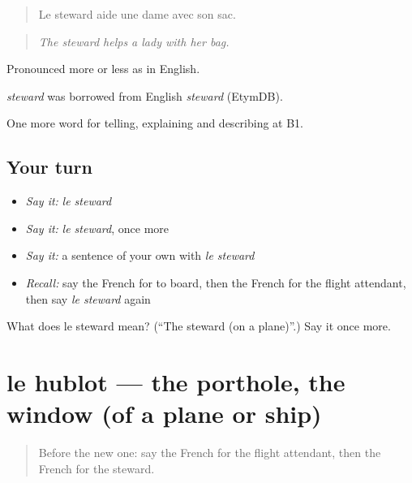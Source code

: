 \begin{quote}
Le steward aide une dame avec son sac.
\end{quote}

\begin{quote}
\emph{The steward helps a lady with her bag.}
\end{quote}

Pronounced more or less as in English.

\begin{cousinweb}
\emph{steward} was borrowed from English \emph{steward} (EtymDB).
\end{cousinweb}

\begin{grammarlens}[title={What you've built}]
One more word for telling, explaining and describing at B1.
\end{grammarlens}

\subsection*{Your turn}
\begin{itemize}
\raggedright
  \item \emph{Say it:} \emph{le steward}
  \item \emph{Say it:} \emph{le steward}, once more
  \item \emph{Say it:} a sentence of your own with \emph{le steward}
  \item \emph{Recall:} say the French for to board, then the French for the flight attendant, then say \emph{le steward} again
\end{itemize}

\begin{tcolorbox}[breakable,colback=teal!4,colframe=teal!35!black,title={Before you move on}]
What does le steward mean? (\textquotedblleft{}The steward (on a plane)\textquotedblright{}.) Say it once more.
\end{tcolorbox}
\section[le hublot]{le hublot — the porthole, the window (of a plane or ship)}

\label{lesson:FR-C418-hublot}



\begin{quote}
Before the new one: say the French for the flight attendant, then the French for the steward.
\end{quote}

